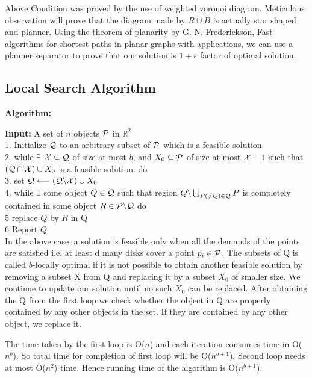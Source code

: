 \documentclass[a4paper,10pt]{article}  %
\begin{document}
	Above Condition was proved by the use of weighted voronoi diagram. Meticulous observation will prove that the diagram made by $R \cup B$ is actually star shaped and planner. Using the theorem of planarity by G. N. Frederickson, Fast algorithms for shortest paths in planar graphs with
	applications\cite{Frederickson87}, we can use a planner separator to prove that our solution is $1+\epsilon$ factor of optimal solution.

	
	
	
	

	\subsection{Local Search Algorithm}
	
	\textbf{Algorithm:}\cite{DeL16}
	
	\textbf{Input:} A set of $n$ objects ${\cal P}$ in $\mathbb{R}^2$\\
	1. Initialize ${\cal Q}$ to an arbitrary subset of ${\cal P}$ which is a feasible solution\\
	2. while $\exists$ ${\cal X}\subseteq {\cal Q}$ of size at most $b$, and $X_0 \subseteq  {\cal P}$ of size at most ${\cal X}-1$ such that $({\cal Q} \cap {\cal X}) \cup X_0$ is a feasible solution. do\\
	3. set ${\cal Q}\longleftarrow({\cal Q}\backslash{\cal X})\cup X_0$\\
	4. while $\exists$ some object $Q\in {\cal Q}$ such that region $Q \backslash \bigcup _{P(\neq Q)\in {\cal Q}} P$ is completely contained in some object $R \in {\cal P} \backslash {\cal Q}$ do\\
	5 replace $Q$ by $R$ in {\cal Q}\\
	6 Report $Q$\\
	
	In the above case, a solution is feasible only when all the demands of the points are satisfied i.e. at least d many disks cover a point $p_i \in {\cal P}$. The subsets of {\cal Q} is called $b$-locally optimal if it is not possible to obtain another feasible solution by removing a subset {\cal X} from {\cal Q} and replacing it by a subset $X_0$ of smaller size. We continue to update our solution until no such $X_0$ can be replaced. After obtaining the {\cal Q} from the first loop we check whether the object in {\cal Q} are properly contained by any other objects in the set. If they are contained by any other object, we replace it.
	
	The time taken by the first loop is O($n$) and each iteration consumes time in O($n^b$). So total time for completion of first loop will be O($n^{b+1}$). Second loop needs at most O($n^2$) time. Hence running time of the algorithm is O($n^{b+1}$).
	
\end{document}
